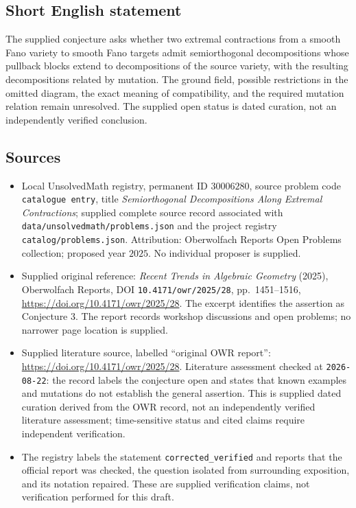\documentclass[11pt]{article}
\begin{document}
\subsection{Short English statement}
The supplied conjecture asks whether two extremal contractions from a smooth Fano variety to smooth Fano targets admit semiorthogonal decompositions whose pullback blocks extend to decompositions of the source variety, with the resulting decompositions related by mutation. The ground field, possible restrictions in the omitted diagram, the exact meaning of compatibility, and the required mutation relation remain unresolved. The supplied open status is dated curation, not an independently verified conclusion.
\subsection{Sources}
\begin{itemize}
\item Local UnsolvedMath registry, permanent ID \(30006280\), source problem code \texttt{catalogue entry}, title \emph{Semiorthogonal Decompositions Along Extremal Contractions}; supplied complete source record associated with \texttt{data/unsolvedmath/problems.json} and the project registry \texttt{catalog/problems.json}. Attribution: Oberwolfach Reports Open Problems collection; proposed year \(2025\). No individual proposer is supplied.
\item Supplied original reference: \emph{Recent Trends in Algebraic Geometry} (2025), Oberwolfach Reports, DOI \texttt{10.4171/owr/2025/28}, pp.\ 1451--1516, \url{https://doi.org/10.4171/owr/2025/28}. The excerpt identifies the assertion as Conjecture 3. The report records workshop discussions and open problems; no narrower page location is supplied.
\item Supplied literature source, labelled ``original OWR report'': \url{https://doi.org/10.4171/owr/2025/28}. Literature assessment checked at \texttt{2026-08-22}: the record labels the conjecture open and states that known examples and mutations do not establish the general assertion. This is supplied dated curation derived from the OWR record, not an independently verified literature assessment; time-sensitive status and cited claims require independent verification.
\item The registry labels the statement \texttt{corrected\_verified} and reports that the official report was checked, the question isolated from surrounding exposition, and its notation repaired. These are supplied verification claims, not verification performed for this draft.
\end{itemize}
\end{document}

